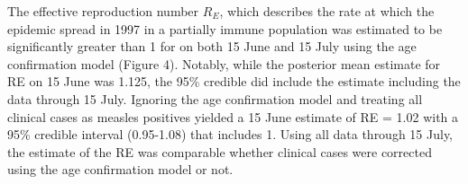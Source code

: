 The effective reproduction number $R_E$, which describes the rate at which the
epidemic spread in 1997 in a partially immune population was estimated
to be significantly greater than 1 for on both 15 June and 15 July using
the age confirmation model (Figure 4). Notably, while the posterior mean
estimate for RE on 15 June was 1.125, the 95\% credible did include the
estimate including the data through 15 July. Ignoring the age
confirmation model and treating all clinical cases as measles positives
yielded a 15 June estimate of RE = 1.02 with a 95\% credible interval
(0.95-1.08) that includes 1. Using all data through 15 July, the
estimate of the RE was comparable whether clinical cases were corrected
using the age confirmation model or not.